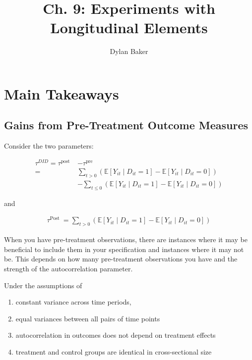 \documentclass[10pt]{article}
\title{Ch. 9: Experiments with Longitudinal Elements}
\author{Dylan Baker}
\begin{document}
\maketitle

\tableofcontents


\section{Main Takeaways}

\subsection{Gains from Pre-Treatment Outcome Measures}

Consider the two parameters:

\begin{align}
        \tau^{D I D}=\tau^{\text {post }} & -\tau^{\text {pre }} \\
        = & \sum_{t>0}\left(\mathbb{E}\left[Y_{i t} \mid D_{i t}=1\right]-\mathbb{E}\left[Y_{i t} \mid D_{i t}=0\right]\right) \\
        & -\sum_{t \leq 0}\left(\mathbb{E}\left[Y_{i t} \mid D_{i t}=1\right]-\mathbb{E}\left[Y_{i t} \mid D_{i t}=0\right]\right)
\end{align}

and

\begin{align}
    \tau^{\text {Post }}=\sum_{t>0}\left(\mathbb{E}\left[Y_{i t} \mid D_{i t}=1\right]-\mathbb{E}\left[Y_{i t} \mid D_{i t}=0\right]\right)
\end{align}

When you have pre-treatment observations, there are instances 
where it may be beneficial to include them in your specification 
and instances where it may not be. This depends on how many 
pre-treatment observations you have and the strength of the 
autocorrelation parameter.

Under the assumptions of 
\begin{enumerate}
    \item constant variance across time periods, 
    \item equal variances between all pairs of time points
    \item autocorrelation in outcomes does not depend on treatment effects
    \item treatment and control groups are identical in cross-sectional size
\end{enumerate}
\end{document}
